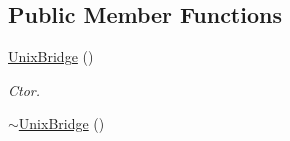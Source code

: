 \subsection*{Public Member Functions}
\begin{DoxyCompactItemize}
\item 
\hypertarget{classUnixBridge_a89812476ce97c7bdc4ae8e6160e583bb}{\hyperlink{classUnixBridge_a89812476ce97c7bdc4ae8e6160e583bb}{Unix\-Bridge} ()}\label{classUnixBridge_a89812476ce97c7bdc4ae8e6160e583bb}

\begin{DoxyCompactList}\small\item\em Ctor. \end{DoxyCompactList}\item 
\hypertarget{classUnixBridge_a1902ba975703ecfe5eecd810c39c671d}{\hyperlink{classUnixBridge_a1902ba975703ecfe5eecd810c39c671d}{$\sim$\-Unix\-Bridge} ()}\label{classUnixBridge_a1902ba975703ecfe5eecd810c39c671d}


\end{DoxyCompactItemize}
